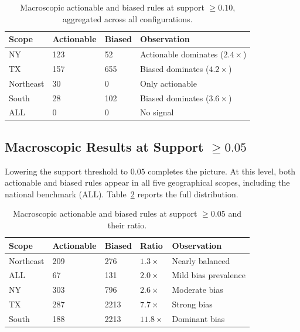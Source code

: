 \begin{table}[htbp]
\centering
\renewcommand{\arraystretch}{1.2}
\caption{Macroscopic actionable and biased rules at support $\geq 0.10$, aggregated across all configurations.}
\label{tab:macro-sup010}
\begin{tabular}{>{\raggedright\arraybackslash}p{} p{} p{} p{}}
  \toprule
  \textbf{Scope} & \textbf{Actionable} & \textbf{Biased} & \textbf{Observation} \\
  \midrule
  NY & 123 & 52 & Actionable dominates ($2.4\times$) \\
  TX & 157 & 655 & Biased dominates ($4.2\times$) \\
  Northeast & 30 & 0 & Only actionable \\
  South & 28 & 102 & Biased dominates ($3.6\times$) \\
  ALL & 0 & 0 & No signal \\
  \bottomrule
\end{tabular}
\renewcommand{\arraystretch}{1.0}
\end{table}

\subsection{Macroscopic Results at Support \texorpdfstring{$\geq 0.05$}{>= 0.05}}

Lowering the support threshold to $0.05$ completes the picture. At this level, both actionable and biased rules appear in all five geographical scopes, including the national benchmark (ALL). Table~\ref{tab:macro-sup005} reports the full distribution.

\begin{table}[htbp]
\centering
\renewcommand{\arraystretch}{1.2}
\caption{Macroscopic actionable and biased rules at support $\geq 0.05$ and their ratio.}
\label{tab:macro-sup005}
\begin{tabular}{>{\raggedright\arraybackslash}p{} p{} p{} p{} p{}}
  \toprule
  \textbf{Scope} & \textbf{Actionable} & \textbf{Biased} & \textbf{Ratio} & \textbf{Observation} \\
  \midrule
  Northeast & 209 & 276 & $1.3\times$ & Nearly balanced \\
  ALL & 67 & 131 & $2.0\times$ & Mild bias prevalence \\
  NY & 303 & 796 & $2.6\times$ & Moderate bias \\
  TX & 287 & 2213 & $7.7\times$ & Strong bias \\
  South & 188 & 2213 & $11.8\times$ & Dominant bias \\
  \bottomrule
\end{tabular}
\renewcommand{\arraystretch}{1.0}
\end{table}

